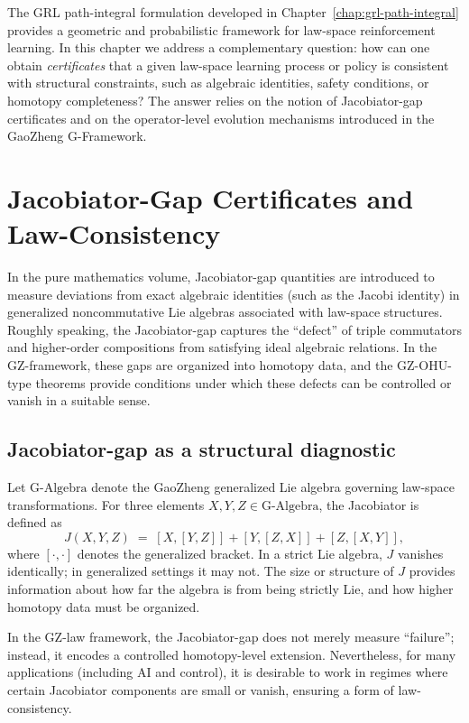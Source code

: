 \documentclass[11pt]{book}
\newcommand{\GAlgebra}{\text{G-Algebra}}
\theoremstyle{plain}
\theoremstyle{definition}
\theoremstyle{remark}
\begin{document}
The GRL path-integral formulation developed in
Chapter~\ref{chap:grl-path-integral} provides a geometric and
probabilistic framework for law-space reinforcement learning. In
this chapter we address a complementary question: how can one obtain
\emph{certificates} that a given law-space learning process or
policy is consistent with structural constraints, such as algebraic
identities, safety conditions, or homotopy completeness? The answer
relies on the notion of Jacobiator-gap certificates and on the
operator-level evolution mechanisms introduced in the GaoZheng
G-Framework.

\section{Jacobiator-Gap Certificates and Law-Consistency}
\label{sec:jacobiator-gap-certificates}


In the pure mathematics volume, Jacobiator-gap quantities are
introduced to measure deviations from exact algebraic identities
(such as the Jacobi identity) in generalized noncommutative Lie
algebras associated with law-space structures. Roughly speaking,
the Jacobiator-gap captures the ``defect'' of triple commutators
and higher-order compositions from satisfying ideal algebraic
relations. In the GZ-framework, these gaps are organized into
homotopy data, and the GZ-OHU-type theorems provide conditions
under which these defects can be controlled or vanish in a suitable
sense.

\subsection*{Jacobiator-gap as a structural diagnostic}

Let $\GAlgebra$ denote the GaoZheng generalized Lie algebra
governing law-space transformations. For three elements
$X,Y,Z \in \GAlgebra$, the Jacobiator is defined as
\[
   J(X,Y,Z)
   \;=\;
   [X,[Y,Z]] + [Y,[Z,X]] + [Z,[X,Y]],
\]
where $[\cdot,\cdot]$ denotes the generalized bracket. In a strict
Lie algebra, $J$ vanishes identically; in generalized settings it
may not. The size or structure of $J$ provides information about
how far the algebra is from being strictly Lie, and how higher
homotopy data must be organized.

In the GZ-law framework, the Jacobiator-gap does not merely measure
``failure''; instead, it encodes a controlled homotopy-level
extension. Nevertheless, for many applications (including AI and
control), it is desirable to work in regimes where certain
Jacobiator components are small or vanish, ensuring a form of
law-consistency.
\end{document}
